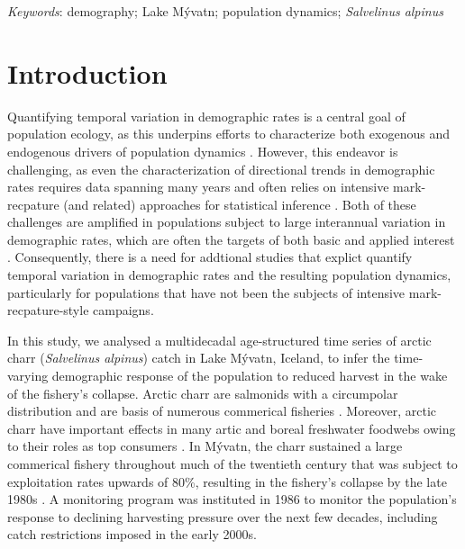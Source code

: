 \documentclass[11pt]{article}
\begin{document}
\bigskip

\textit{Keywords}: {demography; Lake M\'{y}vatn; population dynamics; \emph{Salvelinus alpinus}}

\clearpage




\section*{Introduction}

Quantifying temporal variation in demographic rates is a central goal of population ecology,
as this underpins efforts to characterize both exogenous and endogenous drivers of population dynamics 
\citep{twombly1994comparative, zeng1998, koons2016life}.
However, this endeavor is challenging, 
as even the characterization of directional trends in demographic rates requires
data spanning many years and 
often relies on intensive mark-recpature (and related) approaches for statistical inference
\citep[e.g.,][]{forcada2008life, hunter2010climate}.
Both of these challenges are amplified in populations subject to large interannual variation
in demographic rates, 
which are often the targets of both basic and applied interest
\citep[e.g.,][]{white2007irruptive}.
Consequently, 
there is a need for addtional studies that 
explict quantify temporal variation in demographic rates 
and the resulting population dynamics, 
particularly for populations that have not been the subjects 
of intensive mark-recpature-style campaigns.

In this study, we analysed a multidecadal age-structured time series 
of arctic charr (\emph{Salvelinus alpinus}) catch  in Lake M\'{y}vatn, Iceland, 
to infer the time-varying demographic response of the population 
to reduced harvest in the wake of the fishery's collapse.
Arctic charr are salmonids with a circumpolar distribution
and are basis of numerous commerical fisheries \citep{klemetsen2003atlantic}.
Moreover,
arctic charr have important effects in many artic 
and boreal freshwater foodwebs owing to their roles as top consumers
\citep{jeppesen2001fish, klemetsen2003atlantic}.
In M\'{y}vatn, the charr sustained a large commerical fishery throughout much of the 
twentieth century that was subject to exploitation rates upwards of 80\%,
resulting in the fishery's collapse by the late 1980s \citep{gudbergsson2004}.
A monitoring program was instituted in 1986 to monitor the population's
response to declining harvesting pressure over the next few decades,
including catch restrictions imposed in the early 2000s.
\end{document}

